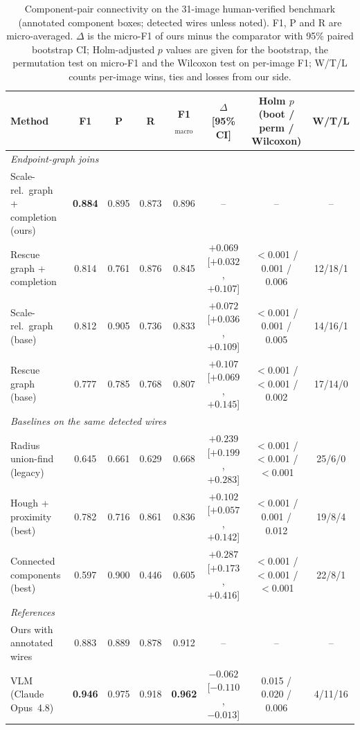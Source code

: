 \documentclass{ieeeaccess}
\begin{document}
\begin{table}[t]
\caption{Component-pair connectivity on the 31-image human-verified benchmark (annotated component boxes; detected wires unless noted). F1, P and R are micro-averaged. {$\Delta$} is the micro-F1 of ours minus the comparator with 95\% paired bootstrap CI; Holm-adjusted $p$ values are given for the bootstrap, the permutation test on micro-F1 and the Wilcoxon test on per-image F1; W/T/L counts per-image wins, ties and losses from our side.}
\label{tab:real_join}
\centering
\footnotesize
\setlength{\tabcolsep}{4pt}
\begin{tabular}{lccccccc}
\toprule
\textbf{Method} & \textbf{F1} & \textbf{P} & \textbf{R} & \textbf{F1$_{\text{macro}}$} & \textbf{$\Delta$ [95\% CI]} & \textbf{Holm $p$ (boot / perm / Wilcoxon)} & \textbf{W/T/L} \\
\midrule
\multicolumn{8}{l}{\emph{Endpoint-graph joins}} \\
Scale-rel.\ graph + completion (ours) & \textbf{0.884} & 0.895 & 0.873 & 0.896 & -- & -- & -- \\
Rescue graph + completion & 0.814 & 0.761 & 0.876 & 0.845 & $+0.069$ [$+0.032$, $+0.107$] & $<$0.001 / 0.001 / 0.006 & 12/18/1 \\
Scale-rel.\ graph (base) & 0.812 & 0.905 & 0.736 & 0.833 & $+0.072$ [$+0.036$, $+0.109$] & $<$0.001 / 0.001 / 0.005 & 14/16/1 \\
Rescue graph (base) & 0.777 & 0.785 & 0.768 & 0.807 & $+0.107$ [$+0.069$, $+0.145$] & $<$0.001 / $<$0.001 / 0.002 & 17/14/0 \\
\midrule
\multicolumn{8}{l}{\emph{Baselines on the same detected wires}} \\
Radius union-find (legacy) & 0.645 & 0.661 & 0.629 & 0.668 & $+0.239$ [$+0.199$, $+0.283$] & $<$0.001 / $<$0.001 / $<$0.001 & 25/6/0 \\
Hough + proximity (best) & 0.782 & 0.716 & 0.861 & 0.836 & $+0.102$ [$+0.057$, $+0.142$] & $<$0.001 / 0.001 / 0.012 & 19/8/4 \\
Connected components (best) & 0.597 & 0.900 & 0.446 & 0.605 & $+0.287$ [$+0.173$, $+0.416$] & $<$0.001 / $<$0.001 / $<$0.001 & 22/8/1 \\
\midrule
\multicolumn{8}{l}{\emph{References}} \\
Ours with annotated wires & 0.883 & 0.889 & 0.878 & 0.912 & -- & -- & -- \\
VLM (Claude Opus~4.8) & \textbf{0.946} & 0.975 & 0.918 & \textbf{0.962} & $-0.062$ [$-0.110$, $-0.013$] & 0.015 / 0.020 / 0.006 & 4/11/16 \\
\bottomrule
\end{tabular}
\end{table}
\end{document}
